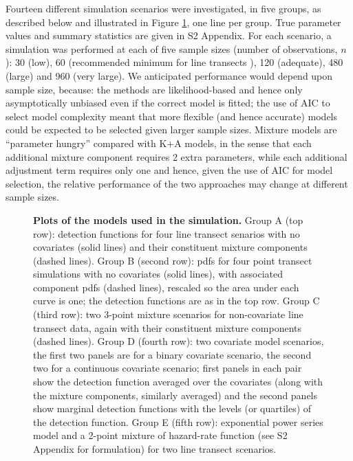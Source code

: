 \documentclass[10pt]{article}
\begin{document}
Fourteen different simulation scenarios were investigated, in five groups, as described below and illustrated in Figure \ref{sim-detfcts}, one line per group. True parameter values and summary statistics are given in S2 Appendix.  For each scenario, a simulation was performed at each of five sample sizes (number of observations, $n$): 30 (low), 60 (recommended minimum for line transects \cite{Buckland:2001vm}), 120 (adequate), 480 (large) and 960 (very large).  We anticipated performance would depend upon sample size, because: the methods are likelihood-based and hence only asymptotically unbiased even if the correct model is fitted; the use of AIC to select model complexity meant that more flexible (and hence accurate) models could be expected to be selected given larger sample sizes. Mixture models are ``parameter hungry'' compared with K+A models, in the sense that each additional mixture component requires 2 extra parameters, while each additional adjustment term requires only one and hence, given the use of AIC for model selection, the relative performance of the two approaches may change at different sample sizes. 

\begin{figure}[!ht]
\centering
\caption{
{\bf Plots of the models used in the simulation.} Group A (top row): detection functions for four line transect senarios with no covariates (solid lines) and their constituent mixture components (dashed lines). Group B (second row): pdfs for four point transect simulations with no covariates (solid lines), with associated component pdfs (dashed lines), rescaled so the area under each curve is one; the detection functions are as in the top row. Group C (third row): two 3-point mixture scenarios for non-covariate line transect data, again with their constituent mixture components (dashed lines). Group D (fourth row): two covariate model scenarios, the first two panels are for a binary covariate scenario, the second two for a continuous covariate scenario; first panels in each pair show the detection function averaged over the covariates (along with the mixture components, similarly averaged) and the second panels show marginal detection functions with the levels (or quartiles) of the detection function.  Group E (fifth row): exponential power series model and a 2-point mixture of hazard-rate function (see S2 Appendix for formulation) for two line transect scenarios.
}
\label{sim-detfcts}
\end{figure}
\end{document}
